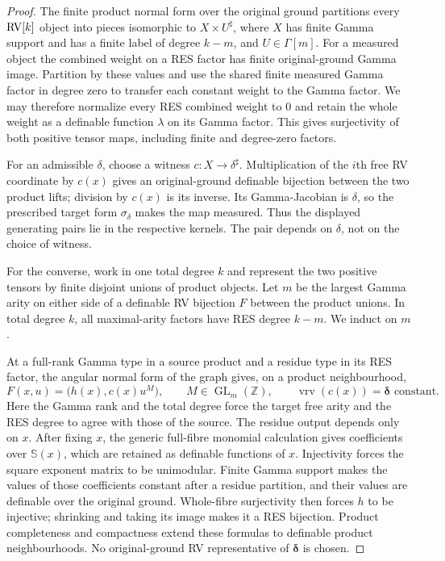 \documentclass[12pt]{amsart}
\theoremstyle{plain}
\theoremstyle{definition}
\theoremstyle{remark}
\numberwithin{equation}{section}
\theoremstyle{plain}
\newcommand{\RV}{\textup{RV}}
\newcommand{\0}{\emptyset}
\DeclareMathOperator{\vrv}{vrv}
\begin{document}
\begin{proof}
The finite product normal form over the original ground partitions
every $\RV[k]$ object into pieces isomorphic to
$X\times U^\sharp$, where $X$ has finite Gamma support and has a
finite label of degree $k-m$, and $U\in\Gamma[m]$. For a measured
object the combined weight on a RES factor has finite original-ground
Gamma image. Partition by these values and use the shared finite
measured Gamma factor in degree zero to transfer each constant weight
to the Gamma factor. We may therefore normalize every RES combined
weight to $0$ and retain the whole weight as a definable function
$\lambda$ on its Gamma factor. This gives surjectivity of both positive
tensor maps, including finite and degree-zero factors.

For an admissible $\delta$, choose a witness $c:X\to\delta^\sharp$.
Multiplication of the $i$th free RV coordinate by $c(x)$ gives an
original-ground definable bijection between the two product lifts;
division by $c(x)$ is its inverse. Its Gamma-Jacobian is $\delta$,
so the prescribed target form $\sigma_\delta$ makes the map measured.
Thus the displayed generating pairs lie in the respective kernels.
The pair depends on $\delta$, not on the choice of witness.

For the converse, work in one total degree $k$ and represent the two
positive tensors by finite disjoint unions of product objects.
Let $m$ be the largest Gamma arity on either side of a definable
RV bijection $F$ between the product unions. In total degree $k$, all
maximal-arity factors have RES degree $k-m$. We induct on $m$.

At a full-rank Gamma type in a source product and a residue type in
its RES factor, the angular normal form of the graph gives, on a
product neighbourhood,
\[
 F(x,u)=\bigl(h(x),c(x)u^M\bigr),\qquad
 M\in\operatorname{GL}_m(\mathbb Z),\qquad
 \vrv(c(x))=\boldsymbol\delta\text{ constant}.
\]
Here the Gamma rank and the total degree force the target free arity
and the RES degree to agree with those of the source. The residue
output depends only on $x$. After fixing $x$, the generic full-fibre
monomial calculation gives coefficients over $\mathbb S(x)$, which
are retained as definable functions of $x$. Injectivity forces the
square exponent matrix to be unimodular. Finite Gamma support makes
the values of those coefficients constant after a residue partition,
and their values are definable over the original ground. Whole-fibre
surjectivity then forces $h$ to be injective; shrinking and taking its
image makes it a RES bijection. Product completeness and compactness
extend these formulas to definable product neighbourhoods. No
original-ground RV representative of $\boldsymbol\delta$ is chosen.


\end{proof}
\end{document}
